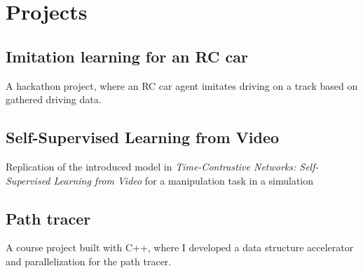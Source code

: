 \documentclass[]{deedy-resume}
\begin{document}
\begin{minipage}[t]{0.66\textwidth}

% 


\section{Projects} 
\subsection{Imitation learning for an RC car}
A hackathon project, where an RC car agent imitates driving on a track based on gathered driving data. 
\sectionsep


\subsection{Self-Supervised Learning from Video}
Replication of the introduced model in \textit{Time-Contrastive Networks: Self-Supervised Learning from Video} for a manipulation task in a simulation  
\sectionsep


\subsection{Path tracer}
A course project built with C++, where I developed a data structure accelerator and parallelization for the path tracer.
\sectionsep


\end{minipage}
\end{document}
